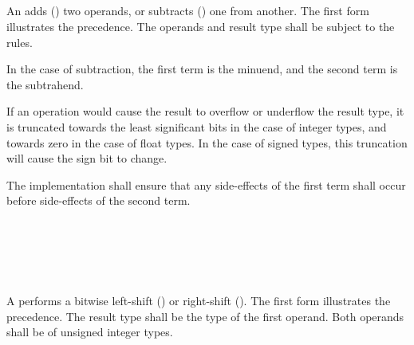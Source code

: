 
\begin{grammar}
 \\
	 \\
	 \terminal{+}  \\
	 \terminal{-}  \\
\end{grammar}

\specsubsubitem
An  adds (\terminal{+}) two operands, or
subtracts (\terminal{-}) one from another. The first form illustrates the
precedence. The operands and result type shall be subject to the  rules.

\specsubsubitem
In the case of subtraction, the first term is the minuend, and the second term
is the subtrahend.

\specsubsubitem
If an operation would cause the result to overflow or underflow the result
type, it is truncated towards the least significant bits in the case of integer
types, and towards zero in the case of float types. In the case of signed
types, this truncation will cause the sign bit to change.

\specsubsubitem
The implementation shall ensure that any side-effects of the first term shall
occur before side-effects of the second term.


\begin{grammar}
 \\
	 \\
	 \terminal{\textless{}\textless{}}  \\
	 \terminal{\textgreater{}\textgreater{}}  \\
\end{grammar}

\specsubsubitem
A  performs a bitwise left-shift
(\terminal{\textless{}\textless{}}) or right-shift (\terminal{\textgreater{}\textgreater{}}). The first
form illustrates the precedence. The result type shall be the type of the first
operand. Both operands shall be of unsigned integer types.

